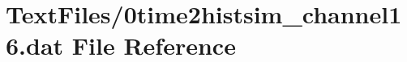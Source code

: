 \hypertarget{0time2histsim__channel16_8dat}{}\section{Text\+Files/0time2histsim\+\_\+channel16.dat File Reference}
\label{0time2histsim__channel16_8dat}
